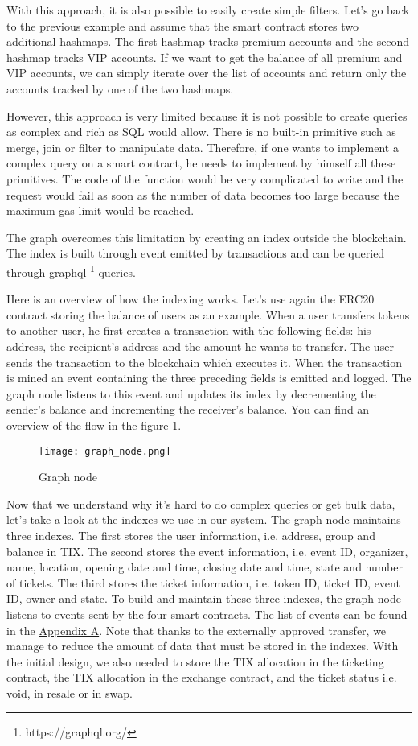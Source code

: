 \documentclass[a4paper,11pt,oneside]{report}
\begin{document}
With this approach, it is also possible to easily create simple filters. Let's go back to the previous example and assume that the smart contract stores two additional hashmaps. The first hashmap tracks premium accounts and the second hashmap tracks VIP accounts. If we want to get the balance of all premium and VIP accounts, we can simply iterate over the list of accounts and return only the accounts tracked by one of the two hashmaps.

However, this approach is very limited because it is not possible to create queries as complex and rich as SQL would allow. There is no built-in primitive such as merge, join or filter to manipulate data. Therefore, if one wants to implement a complex query on a smart contract, he needs to implement by himself all these primitives. The code of the function would be very complicated to write and the request would fail as soon as the number of data becomes too large because the maximum gas limit would be reached.

The graph overcomes this limitation by creating an index outside the blockchain. The index is built through event emitted by transactions and can be queried through graphql \footnote{https://graphql.org/} queries.

Here is an overview of how the indexing works. Let's use again the ERC20 contract storing the balance of users as an example. When a user transfers tokens to another user, he first creates a transaction with the following fields: his address, the recipient's address and the amount he wants to transfer. The user sends the transaction to the blockchain which executes it. When the transaction is mined an event containing the three preceding fields is emitted and logged. The graph node listens to this event and updates its index by decrementing the sender's balance and incrementing the receiver's balance. You can find an overview of the flow in the figure \hyperref[fig:graph_node]{\ref{fig:graph_node}}.

\begin{figure}[h!] 
  \centering
  \texttt{[image: graph\_node.png]}
  \caption{Graph node}
  \label{fig:graph_node}
\end{figure}

Now that we understand why it's hard to do complex queries or get bulk data, let's take a look at the indexes we use in our system. The graph node maintains three indexes. The first stores the user information, i.e. address, group and balance in TIX. The second stores the event information, i.e. event ID, organizer, name, location, opening date and time, closing date and time, state and number of tickets. The third stores the ticket information, i.e. token ID, ticket ID, event ID, owner and state. To build and maintain these three indexes, the graph node listens to events sent by the four smart contracts. The list of events can be found in the \hyperref[sec:appendix_a]{Appendix A}. Note that thanks to the externally approved transfer, we manage to reduce the amount of data that must be stored in the indexes. With the initial design, we also needed to store the TIX allocation in the ticketing contract, the TIX allocation in the exchange contract, and the ticket status i.e. void, in resale or in swap.
\end{document}
